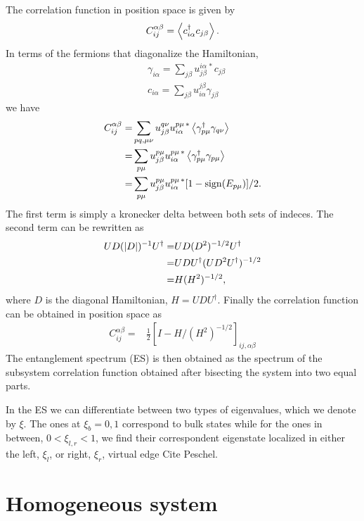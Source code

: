 \documentclass[twocolumn,amsmath,longbibliography,amssymb,superscriptaddress]{revtex4-1}
\newcommand{\carlos}[1]{{\color{red} #1}}
\begin{document}
The correlation function in position space is given by
\begin{align*}
C_{ij}^{\alpha \beta} = \expval{c_{i\alpha}^\dagger c_{j\beta}}.
\end{align*}
In terms of the fermions that diagonalize the Hamiltonian, 
\begin{align*}
& \gamma_{i\alpha} = \sum_{j\beta}u_{j\beta}^{i\alpha \, \ast} c_{j\beta} \\
& c_{i\alpha} = \sum_{j\beta} u^{j\beta}_{i\alpha} \gamma_{j\beta}
\end{align*}
we have
\begin{align*}
C_{ij}^{\alpha \beta} =& \sum_{pq,\mu\nu} u^{q\nu }_{j\beta} u^{p\mu \, \ast}_{i\alpha} \expval{\gamma^\dagger_{p\mu} \gamma_{q\nu} } \\
=&  \sum_{p\mu} u^{p\mu }_{j\beta} u^{p\mu \, \ast}_{i\alpha} \expval{\gamma^\dagger_{p\mu} \gamma_{p\mu} } \\
=&  \sum_{p\mu} u^{p\mu }_{j\beta} u^{p\mu \, \ast}_{i\alpha} [1-{\rm sign}(E_{p\mu})]/2.
\end{align*}
The first term is simply a kronecker delta between both sets of indeces. The second term can be rewritten as
\begin{align*}
UD(\abs{D})^{-1}U^\dagger =& UD(D^2)^{-1/2}U^\dagger \\
=& U D U^\dagger (U D^2 U^\dagger)^{-1/2} \\
=& H(H^2)^{-1/2},
\end{align*}
where $D$ is the diagonal Hamiltonian, $H=UDU^\dagger$. Finally the correlation function can be obtained in position space as
\begin{align*}
C_{ij}^{\alpha \beta} =& \frac{1}{2}\left[I - H/ (H^2)^{-1/2} \right]_{ij, \alpha \beta}
\end{align*}
The entanglement spectrum (ES) is then obtained as the spectrum of the subsystem correlation function obtained after bisecting the system into two equal parts. 

In the ES we can differentiate between two types of eigenvalues, which we denote by $\xi$. The ones at $\xi_b = 0,1$ correspond to bulk states while for the ones in between, $0<\xi_{l,r}<1$, we find their correspondent eigenstate localized in either the left, $\xi_l$, or right, $\xi_r$, virtual edge \carlos{Cite Peschel}. 

\section{Homogeneous system}
\end{document}
